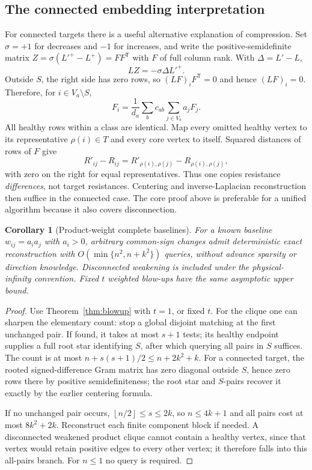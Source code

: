 \documentclass[11pt,letterpaper]{article}
\newtheorem{corollary}[theorem]{Corollary}
\newcommand{\floor}[1]{\left\lfloor #1\right\rfloor}
\begin{document}
\subsection{The connected embedding interpretation}
For connected targets there is a useful alternative explanation of compression. Set $\sigma=+1$ for decreases and $-1$ for increases, and write the positive-semidefinite matrix $Z=\sigma(L'^+-L^+)=FF^{\mathsf T}$ with $F$ of full column rank. With $\Delta=L'-L$,
\[
 LZ=-\sigma\Delta L'^+.
\]
Outside $S$, the right side has zero rows, so $(LF)_iF^{\mathsf T}=0$ and hence $(LF)_i=0$. Therefore, for $i\in V_a\setminus S$,
\[
 F_i=\frac1{d_a}\sum_b c_{ab}\sum_{j\in V_b}a_jF_j.
\]
All healthy rows within a class are identical. Map every omitted healthy vertex to its representative $\rho(i)\in T$ and every core vertex to itself. Squared distances of rows of $F$ give
\[
 R'_{ij}-R_{ij}=R'_{\rho(i),\rho(j)}-R_{\rho(i),\rho(j)},
\]
with zero on the right for equal representatives. Thus one copies resistance \emph{differences}, not target resistances. Centering and inverse-Laplacian reconstruction then suffice in the connected case. The core proof above is preferable for a unified algorithm because it also covers disconnection.

\begin{corollary}[Product-weight complete baselines]\label{cor:product}
For a known baseline $w_{ij}=a_i a_j$ with $a_i>0$, arbitrary common-sign changes admit deterministic exact reconstruction with $O(\min\{n^2,n+k^2\})$ queries, without advance sparsity or direction knowledge. Disconnected weakening is included under the physical-infinity convention. Fixed $t$ weighted blow-ups have the same asymptotic upper bound.
\end{corollary}
\begin{proof}
Use Theorem~\ref{thm:blowup} with $t=1$, or fixed $t$. For the clique one can sharpen the elementary count: stop a global disjoint matching at the first unchanged pair. If found, it takes at most $s+1$ tests; its healthy endpoint supplies a full root star identifying $S$, after which querying all pairs in $S$ suffices. The count is at most $n+s(s+1)/2\le n+2k^2+k$. For a connected target, the rooted signed-difference Gram matrix has zero diagonal outside $S$, hence zero rows there by positive semidefiniteness; the root star and $S$-pairs recover it exactly by the earlier centering formula.

If no unchanged pair occurs, $\floor{n/2}\le s\le2k$, so $n\le4k+1$ and all pairs cost at most $8k^2+2k$. Reconstruct each finite component block if needed. A disconnected weakened product clique cannot contain a healthy vertex, since that vertex would retain positive edges to every other vertex; it therefore falls into this all-pairs branch. For $n\le1$ no query is required.
\end{proof}
\end{document}
